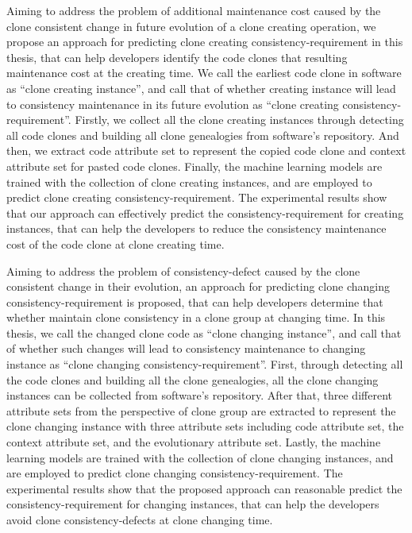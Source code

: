 {Aiming to address the problem of additional maintenance cost caused by the clone consistent change in future evolution of a clone creating operation, we propose an approach for predicting clone creating consistency-requirement in this thesis, that can help developers identify the code clones that resulting maintenance cost at the creating time.
We call the earliest code clone in software as ``clone creating instance'', and call that of whether creating instance will lead to consistency maintenance in its future evolution as ``clone creating consistency-requirement''.
Firstly, we collect all the clone creating instances through detecting all code clones and building all clone genealogies from software's repository.
And then, we extract code attribute set  to represent the copied code clone and context attribute set for pasted code clones.
Finally, the machine learning models are trained with the collection of clone creating instances, and are employed to predict clone creating consistency-requirement. 
The experimental results show that our approach can effectively predict the consistency-requirement for creating instances, that can help the developers to reduce the consistency maintenance cost of the code clone at clone creating time.

Aiming to address the problem of consistency-defect caused by the clone consistent change in their evolution, an approach for predicting clone changing consistency-requirement is proposed, that can help developers determine that whether maintain clone consistency in a clone group at changing time. 
In this thesis, we call the changed clone code as ``clone changing instance'', and call that of whether such changes will lead to consistency maintenance to changing instance as ``clone changing consistency-requirement''.
First, through detecting all the code clones and building all the clone genealogies, all the clone changing instances can be collected  from software's repository.
After that, three different attribute sets from the perspective of clone group are extracted to represent the clone changing instance with three attribute sets including code attribute set, the context attribute set, and the evolutionary attribute set.
Lastly, the machine learning models are trained with the collection of clone changing instances, and are employed to predict clone changing consistency-requirement.
The experimental results show that the proposed approach can reasonable predict the consistency-requirement for changing instances, that can help the developers avoid clone consistency-defects at clone changing time.

}
